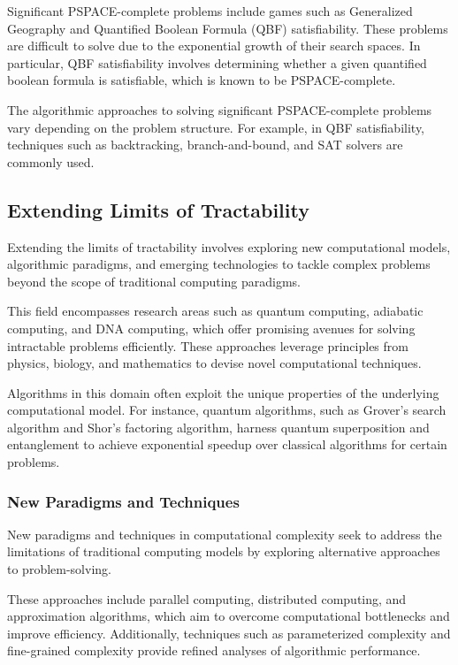 \documentclass[12pt]{book} %
\begin{document}
Significant PSPACE-complete problems include games such as Generalized Geography and Quantified Boolean Formula (QBF) satisfiability. These problems are difficult to solve due to the exponential growth of their search spaces. In particular, QBF satisfiability involves determining whether a given quantified boolean formula is satisfiable, which is known to be PSPACE-complete.

The algorithmic approaches to solving significant PSPACE-complete problems vary depending on the problem structure. For example, in QBF satisfiability, techniques such as backtracking, branch-and-bound, and SAT solvers are commonly used.

\subsection{Extending Limits of Tractability}

Extending the limits of tractability involves exploring new computational models, algorithmic paradigms, and emerging technologies to tackle complex problems beyond the scope of traditional computing paradigms.

This field encompasses research areas such as quantum computing, adiabatic computing, and DNA computing, which offer promising avenues for solving intractable problems efficiently. These approaches leverage principles from physics, biology, and mathematics to devise novel computational techniques.

Algorithms in this domain often exploit the unique properties of the underlying computational model. For instance, quantum algorithms, such as Grover's search algorithm and Shor's factoring algorithm, harness quantum superposition and entanglement to achieve exponential speedup over classical algorithms for certain problems.

\subsubsection{New Paradigms and Techniques}

New paradigms and techniques in computational complexity seek to address the limitations of traditional computing models by exploring alternative approaches to problem-solving.

These approaches include parallel computing, distributed computing, and approximation algorithms, which aim to overcome computational bottlenecks and improve efficiency. Additionally, techniques such as parameterized complexity and fine-grained complexity provide refined analyses of algorithmic performance.
\end{document}

